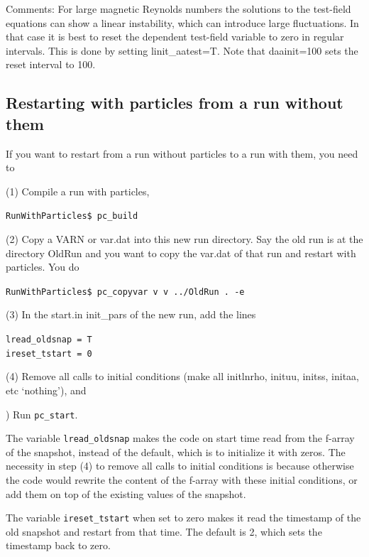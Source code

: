 \documentclass[\mydriver,12pt,twoside,notitlepage,a4paper]{article}
\newcommand{\code}[1]{\texttt{#1}}
\begin{document}
Comments:
For large magnetic Reynolds numbers the solutions to the test-field equations
can show a linear instability, which can introduce large fluctuations.
In that case it is best to reset the dependent test-field variable to zero
in regular intervals.
This is done by setting linit\_aatest=T. Note that daainit=100 sets the
reset interval to 100.

\subsection{Restarting with particles from a run without them}
\label{RestartingWithParticles}

If you want to restart from a run without particles to a run with
them, you need to 

\noindent (1) Compile a run with particles, 

\code{RunWithParticles\$ pc\_build}

\noindent (2) Copy a VARN
or var.dat into this new run directory. Say the old run is at the
directory OldRun and you want to copy the var.dat of that run and
restart with particles. You do 

\code{RunWithParticles\$ pc\_copyvar v v ../OldRun . -e }

\noindent (3) In the start.in init\_pars of the new run, add the lines 

\code{lread\_oldsnap = T}\\
\code{ireset\_tstart = 0}

\noindent (4) Remove all calls to initial conditions (make all
initlnrho, inituu, initss, initaa, etc `nothing'), and  

) Run \code{pc\_start}. 

The variable \code{lread\_oldsnap} makes the code on start time read
from the f-array of the snapshot, instead of the default, which is to
initialize it with zeros. The necessity in step (4) to remove all calls to
initial conditions is because otherwise the code would rewrite the
content of the f-array with these initial conditions, or add them on
top of the existing values of the snapshot. 

The variable \code{ireset\_tstart} when set to zero makes it read the timestamp of
the old snapshot and restart from that time. The default is 2, which
sets the timestamp back to zero. 

\end{document}
